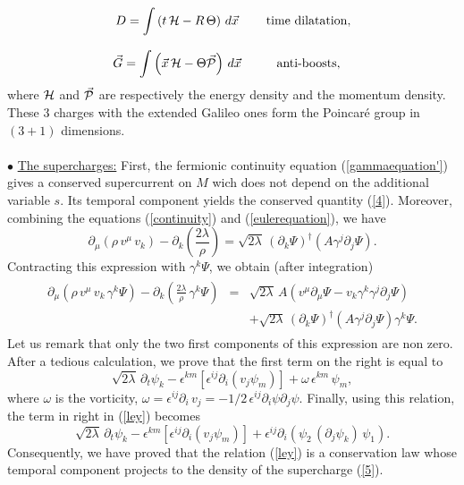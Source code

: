 \documentclass[11pt,a4paper]{article}
\begin{document}
\begin{eqnarray}
\begin{array}{ccc}
D=\displaystyle{\int \left(t\,{\cal H}-R\,\Theta\right)\,d\vec{x}} & &\mbox{time dilatation},\\
\\
\vec{G}=\displaystyle{\int \left(\vec{x}\,{\cal H}-\Theta\vec{{\cal P}}\right)\,d\vec{x}} & &\mbox{anti-boosts},\\
\end{array}
\label{poincare}
\end{eqnarray}
where ${\cal H}$ and $\vec{{\cal P}}$ are respectively the energy density and the momentum density. These $3$ charges with the extended Galileo ones form the Poincar\'e group in $(3+1)$ dimensions.\\
\\
$\bullet$ \underline{The supercharges:} First, the fermionic continuity equation (\ref{gammaequation'}) gives a conserved supercurrent on $M$ wich does not depend on the additional variable $s$. Its temporal component yields the conserved quantity (\ref{4}). Moreover, combining the equations (\ref{continuity}) and (\ref{eulerequation}), we have
$$
\partial_\mu\left(\rho\,v^\mu\,v_k\right)-\partial_k(\frac{2\lambda}{\rho})=\sqrt{2\lambda}\,(\partial_k\Psi)^\dagger \left(A\gamma^j\partial_j\Psi\right).
$$
Contracting this expression with $\gamma^k\Psi$, we obtain (after integration) 
\begin{eqnarray}
\begin{array}{lll}
\partial_\mu\left(\rho\,v^\mu\,v_k\,\gamma^k\Psi\right)-\displaystyle{\partial_k(\frac{2\lambda}{\rho}\,\gamma^k\Psi)}& = &\sqrt{2\lambda}\,A\left(v^\mu\partial_\mu\Psi -v_k\gamma^k\gamma^j\partial_j\Psi\right) \\
[4mm]
& & +\sqrt{2\lambda}\,(\partial_k\Psi)^\dagger\left(A\gamma^j\partial_j\Psi\right)\gamma^k\Psi.
\end{array}
\label{ley}
\end{eqnarray}
Let us remark that only the two first components of this expression are non zero. After a tedious calculation, we prove that the first term on the right is equal to
$$
\sqrt{2\lambda}\,\partial_t\psi_k-\epsilon^{km}\left[\epsilon^{ij}\partial_i(v_j\psi_m)\right]+\omega\,\epsilon^{km}\,\psi_m,
$$
where $\omega$ is the vorticity, $\omega=\epsilon^{ij}\partial_i\,v_j=-1/2\,\epsilon^{ij}\partial_i\psi\partial_j\psi$. Finally, using this relation, the term in right in (\ref{ley}) becomes
$$
\sqrt{2\lambda}\,\partial_t\psi_k-\epsilon^{km}\left[\epsilon^{ij}\partial_i(v_j\psi_m)\right]+\epsilon^{ij}\partial_i\left(\psi_2\,(\partial_j \psi_k)\,\psi_1\right).
$$
Consequently, we have proved that the relation (\ref{ley}) is a conservation law whose temporal component projects to the density of the supercharge (\ref{5}).
\end{document}
